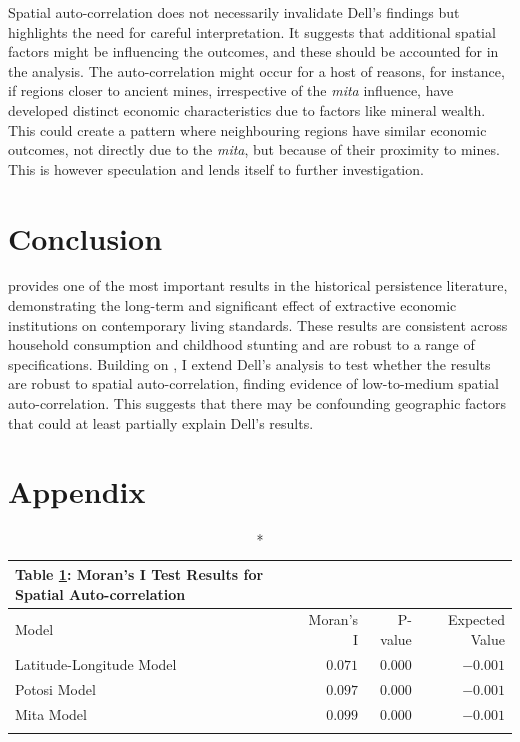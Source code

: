 \documentclass[12pt]{article}
\begin{document}
Spatial auto-correlation does not necessarily invalidate Dell's findings but highlights the need for careful interpretation. It suggests that additional spatial factors might be influencing the outcomes, and these should be accounted for in the analysis. The auto-correlation might occur for a host of reasons, for instance, if regions closer to ancient mines, irrespective of the \emph{mita} influence, have developed distinct economic characteristics due to factors like mineral wealth. This could create a pattern where neighbouring regions have similar economic outcomes, not directly due to the \emph{mita}, but because of their proximity to mines. This is however speculation and lends itself to further investigation. 

\section{Conclusion}
\autocite{Dell2010Mita} provides one of the most important results in the historical persistence literature, demonstrating the long-term and significant effect of extractive economic institutions on contemporary living standards. These results are consistent across household consumption and childhood stunting and are robust to a range of specifications. Building on \autocite{Kelly2019ThePersistence}, I extend Dell's analysis to test whether the results are robust to spatial auto-correlation, finding evidence of low-to-medium spatial auto-correlation. This suggests that there may be confounding geographic factors that could at least partially explain Dell's results.

\pagebreak
\section{Appendix} \label{sec:appendix}

\begin{longtable}{lrrr}
\caption*{
{Table \ref{tab:moran}: Moran's I Test Results for Spatial Auto-correlation}
} \\ 
\toprule
Model & Moran's I & P-value & Expected Value \\ 
\midrule
Latitude-Longitude Model & $0.071$ & $0.000$ & $-0.001$ \\ 
Potosi Model & $0.097$ & $0.000$ & $-0.001$ \\ 
Mita Model & $0.099$ & $0.000$ & $-0.001$ \\ 
\bottomrule
\label{tab:moran}
\end{longtable}
\end{document}
